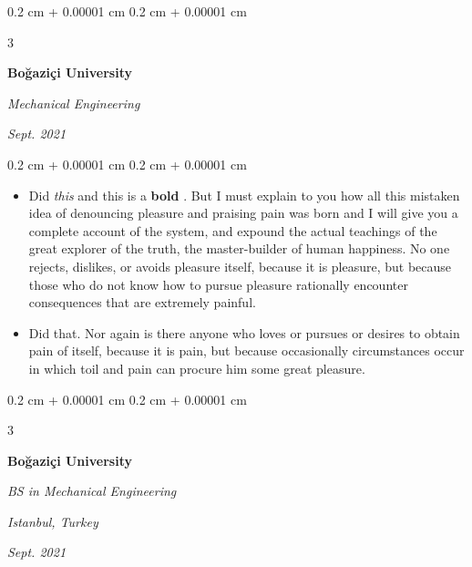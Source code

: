 \documentclass[10pt, letterpaper]{article}
\newenvironment{highlights}{
    \begin{itemize}[
        topsep=0.10 cm,
        parsep=0.10 cm,
        partopsep=0pt,
        itemsep=0pt,
        leftmargin=0.4 cm + 10pt + 0.6 cm
    ]
}{
    \end{itemize}
} %
\newenvironment{onecolentry}{
    \begin{adjustwidth}{
        0.2 cm + 0.00001 cm
    }{
        0.2 cm + 0.00001 cm
    }
}{
    \end{adjustwidth}
} %
\newenvironment{threecolentry}[3][]{
    \onecolentry
    \def\thirdColumn{#3}
    \setcolumnwidth{0.6 cm, \fill, 4.5 cm}
    \begin{paracol}{3}
    #2 \switchcolumn
}{
    \switchcolumn \raggedleft \thirdColumn
    \end{paracol}
    \endonecolentry
} %
\let\hrefWithoutArrow\href
\renewcommand{\href}[2]{\hrefWithoutArrow{#1}{\mbox{\ifthenelse{\equal{#2}{}}{ }{#2 }\raisebox{.15ex}{\footnotesize \faExternalLink*}}}}
\begin{document}
        \vspace{0.2 cm-3px}

        \begin{threecolentry}{
            \vspace*{\fill}
            \textbullet
            \vspace*{3px}
            \vspace*{\fill}
        }{
            
            
        \textit{Sept. 2021}}
            \textbf{Boğaziçi University}

            \textit{Mechanical Engineering}
        \end{threecolentry}

        \vspace{0.10 cm-3px}
        \begin{onecolentry}
            \begin{highlights}
                \item Did \textit{this} and this is a \textbf{bold} \href{https://example.com}{link}. But I must explain to you how all this mistaken idea of denouncing pleasure and praising pain was born and I will give you a complete account of the system, and expound the actual teachings of the great explorer of the truth, the master-builder of human happiness. No one rejects, dislikes, or avoids pleasure itself, because it is pleasure, but because those who do not know how to pursue pleasure rationally encounter consequences that are extremely painful.
                \item Did that. Nor again is there anyone who loves or pursues or desires to obtain pain of itself, because it is pain, but because occasionally circumstances occur in which toil and pain can procure him some great pleasure.
            \end{highlights}
        \end{onecolentry}


        \vspace{0.2 cm-3px}

        \begin{threecolentry}{
            \vspace*{\fill}
            \textbullet
            \vspace*{3px}
            \vspace*{\fill}
        }{
        \textit{Istanbul, Turkey}    
            
        \textit{Sept. 2021}}
            \textbf{Boğaziçi University}

            \textit{BS in Mechanical Engineering}
        \end{threecolentry}
\end{document}
